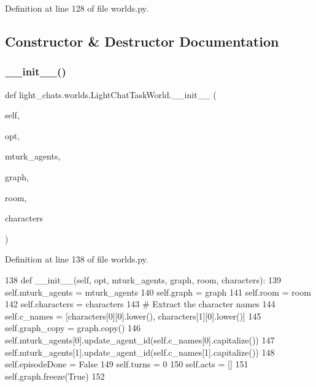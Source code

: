 Definition at line 128 of file worlds.\+py.



\subsection{Constructor \& Destructor Documentation}
\mbox{\label{classlight__chats_1_1worlds_1_1LightChatTaskWorld_a5ace94e512c57a19b5d25973c9db5346}} 
\subsubsection{\texorpdfstring{\+\_\+\+\_\+init\+\_\+\+\_\+()}{\_\_init\_\_()}}
{\footnotesize\ttfamily def light\+\_\+chats.\+worlds.\+Light\+Chat\+Task\+World.\+\_\+\+\_\+init\+\_\+\+\_\+ (\begin{DoxyParamCaption}\item[{}]{self,  }\item[{}]{opt,  }\item[{}]{mturk\+\_\+agents,  }\item[{}]{graph,  }\item[{}]{room,  }\item[{}]{characters }\end{DoxyParamCaption})}



Definition at line 138 of file worlds.\+py.


\begin{DoxyCode}
138     \textcolor{keyword}{def }\_\_init\_\_(self, opt, mturk\_agents, graph, room, characters):
139         self.mturk\_agents = mturk\_agents
140         self.graph = graph
141         self.room = room
142         self.characters = characters
143         \textcolor{comment}{# Extract the character names}
144         self.c\_names = [characters[0][0].lower(), characters[1][0].lower()]
145         self.graph\_copy = graph.copy()
146         self.mturk\_agents[0].update\_agent\_id(self.c\_names[0].capitalize())
147         self.mturk\_agents[1].update\_agent\_id(self.c\_names[1].capitalize())
148         self.episodeDone = \textcolor{keyword}{False}
149         self.turns = 0
150         self.acts = []
151         self.graph.freeze(\textcolor{keyword}{True})
152 
\end{DoxyCode}


